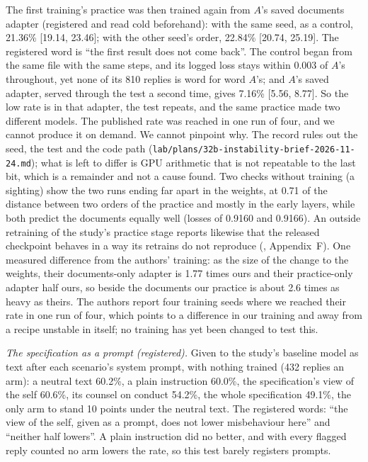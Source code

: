 \documentclass[11pt]{article}
\begin{document}
The first training's practice was then trained again from $A$'s saved documents adapter (registered and read cold beforehand): with the same seed, as a control, 21.36\% [19.14, 23.46]; with the other seed's order, 22.84\% [20.74, 25.19]. The registered word is ``the first result does not come back''. The control began from the same file with the same steps, and its logged loss stays within 0.003 of $A$'s throughout, yet none of its 810 replies is word for word $A$'s; and $A$'s saved adapter, served through the test a second time, gives 7.16\% [5.56, 8.77]. So the low rate is in that adapter, the test repeats, and the same practice made two different models. The published rate was reached in one run of four, and we cannot produce it on demand. We cannot pinpoint why. The record rules out the seed, the test and the code path (\texttt{lab/plans/32b-instability-brief-2026-11-24.md}); what is left to differ is GPU arithmetic that is not repeatable to the last bit, which is a remainder and not a cause found. Two checks without training (a sighting) show the two runs ending far apart in the weights, at 0.71 of the distance between two orders of the practice and mostly in the early layers, while both predict the documents equally well (losses of 0.9160 and 0.9166). An outside retraining of the study's practice stage reports likewise that the released checkpoint behaves in a way its retrains do not reproduce (\citealt{delafuente2026sft}, Appendix~F). One measured difference from the authors' training: as the size of the change to the weights, their documents-only adapter is 1.77 times ours and their practice-only adapter half ours, so beside the documents our practice is about 2.6 times as heavy as theirs. The authors report four training seeds where we reached their rate in one run of four, which points to a difference in our training and away from a recipe unstable in itself; no training has yet been changed to test this.

\emph{The specification as a prompt (registered).} Given to the study's baseline model as text after each scenario's system prompt, with nothing trained (432 replies an arm): a neutral text 60.2\%, a plain instruction 60.0\%, the specification's view of the self 60.6\%, its counsel on conduct 54.2\%, the whole specification 49.1\%, the only arm to stand 10 points under the neutral text. The registered words: ``the view of the self, given as a prompt, does not lower misbehaviour here'' and ``neither half lowers''. A plain instruction did no better, and with every flagged reply counted no arm lowers the rate, so this test barely registers prompts. %
\end{document}
